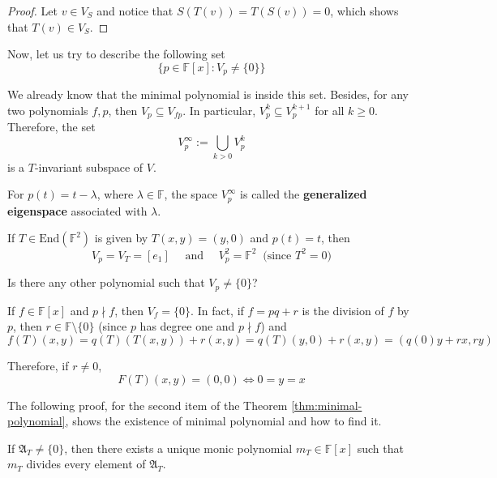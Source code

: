 \begin{proof}
	Let $v \in V_S$ and notice that $S(T(v)) = T(S(v)) = 0$, which shows that $T(v) \in V_S$.
\end{proof}

Now, let us try to describe the following set
\begin{equation}\label{eq:set-goal-describe}
	\{ p \in \mathbb{F}[x] : V_p \neq \{ 0 \} \}
\end{equation}

We already know that the minimal polynomial is inside this set. Besides, for any two polynomials $f, p$, then $V_p \subseteq V_{fp}$. In particular, $V_p^k \subseteq V_p^{k+1}$ for all $k \geq 0$. Therefore, the set
\[
	V_p^\infty := \bigcup_{k > 0} V_p^k
\]
is a $T$-invariant subspace of $V$.

\begin{definition}
	For $p(t) = t - \lambda$, where $\lambda \in \mathbb{F}$, the space $V_p^\infty$ is called the \textbf{generalized eigenspace} associated with $\lambda$.
\end{definition}

\begin{example}
	If $T \in \text{End}(\mathbb{F}^2)$ is given by $T(x,y) = (y,0)$ and $p(t) = t$, then
	\[
		V_p = V_T = [e_1] \quad \text{ and } \quad V_p^2 = \mathbb{F}^2 ~\text{ (since $T^2 = 0$)}
	\]
	
	Is there any other polynomial such that $V_p \neq \{ 0 \}$?
	
	If $f \in \mathbb{F}[x]$ and $p \nmid f$, then $V_f = \{ 0 \}$. In fact, if $f = pq+r$ is the division of $f$ by $p$, then $r \in \mathbb{F} \setminus \{ 0 \}$ (since $p$ has degree one and $p \nmid f$) and
	\[
		f(T)(x,y) = q(T)(T(x,y)) + r(x,y) = q(T)(y,0) + r(x,y) = (q(0)y + rx, ry)
	\]
	
	Therefore, if $r \neq 0$, 
	\[
		F(T)(x,y) = (0, 0) \iff 0 = y = x
	\]
\end{example}

The following proof, for the second item of the Theorem \ref{thm:minimal-polynomial}, shows the existence of minimal polynomial and how to find it.

\begin{theorem}
	If $\mathfrak{A}_T \neq \{ 0 \}$, then there exists a unique monic polynomial $m_T \in \mathbb{F}[x]$ such that $m_T$ divides every element of $\mathfrak{A}_T$.
\end{theorem}


